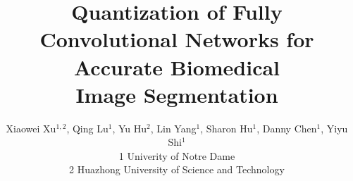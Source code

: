 \documentclass[10pt,twocolumn,letterpaper]{article}
\begin{document}
\title{Quantization of Fully Convolutional Networks for Accurate Biomedical\\ Image Segmentation }

\author{
Xiaowei Xu$^{1,2}$, Qing Lu$^1$, Yu Hu$^2$, Lin Yang$^1$, Sharon Hu$^1$, Danny Chen$^1$, Yiyu Shi$^1$\\
1 Univerity of Notre Dame\\
2 Huazhong University of Science and Technology\\
}

\maketitle
\end{document}
